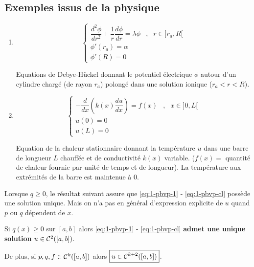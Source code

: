 \subsection*{Exemples issus de la physique}
\begin{enumerate}[label=\alph*)]
    \item 
        \[
            \left\lbrace
            \begin{array}{lll}
                \dfrac{d^2\phi}{dr^2} + \dfrac{1}{r} \dfrac{d\phi}{dr} = \lambda \phi & , & r \in ]r_a,R[
                    \\ [5pt]
            \phi'(r_a) = \alpha
            \\ [2pt]
            \phi'(R) = 0
            \end{array}
            \right.
        \]

        Equations de Debye-Hückel donnant le potentiel électrique $\phi$ autour
        d'un cylindre chargé (de rayon $r_a$) polongé dans une solution
        ionique ($r_a < r < R$).

    \item 
        \[
            \left\lbrace
            \begin{array}{lll}
            - \dfrac{d}{dx}\left( k(x) \dfrac{du}{dx} \right) = f(x) & , & x \in ]0,L[
            \\ [5pt]
            u(0) = 0
            \\ [2pt]
            u(L) = 0 
            \end{array}
            \right.
        \]

        Equation de la chaleur stationnaire donnant la température $u$ dans
        une barre de longueur $L$ chauffée et de conductivité $k(x)$ variable.
        ($f(x) = $ quantité de chaleur fournie par unité de temps et de longueur).
        La température aux extrémités de la barre est maintenue à 0.
\end{enumerate}

Lorsque $q \geq 0$, le résultat suivant assure que \eqref{eq:1-pbvp-1} - \eqref{eq:1-pbvp-cl}
possède une solution unique. Mais on n'a pas en général d'expression explicite
de $u$ quand $p$ ou $q$ dépendent de $x$.

\begin{ftheo}
    Si $q(x) \geq 0$ sur $[a,b]$ alors \eqref{eq:1-pbvp-1} - \eqref{eq:1-pbvp-cl}
    \textbf{admet une unique solution} $u \in \mathcal{C}^2([a,b])$.
    
    De plus, si $p,q,f \in \mathcal{C}^k([a,b])$
    alors $\boxed{u \in \mathcal{C}^{k+2}([a,b])}$.
\end{ftheo}

